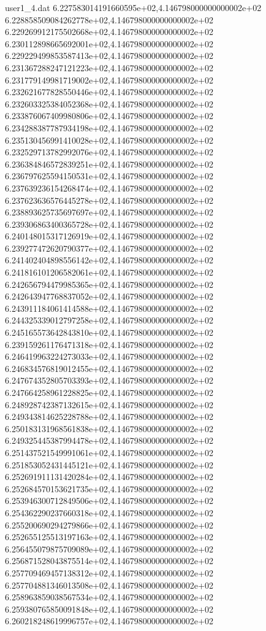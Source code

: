 \begin{filecontents}{user1_4.dat}
6.227583014191660595e+02,4.146798000000000002e+02
6.228858509084262778e+02,4.146798000000000002e+02
6.229269912175502668e+02,4.146798000000000002e+02
6.230112898665692001e+02,4.146798000000000002e+02
6.229229499853587413e+02,4.146798000000000002e+02
6.231367288247121223e+02,4.146798000000000002e+02
6.231779149981719002e+02,4.146798000000000002e+02
6.232621677828550446e+02,4.146798000000000002e+02
6.232603325384052368e+02,4.146798000000000002e+02
6.233876067409980806e+02,4.146798000000000002e+02
6.234288387787934198e+02,4.146798000000000002e+02
6.235130456991410028e+02,4.146798000000000002e+02
6.232529713782992076e+02,4.146798000000000002e+02
6.236384846572839251e+02,4.146798000000000002e+02
6.236797625594150531e+02,4.146798000000000002e+02
6.237639236154268474e+02,4.146798000000000002e+02
6.237623636576445278e+02,4.146798000000000002e+02
6.238893625735697697e+02,4.146798000000000002e+02
6.239306863400365728e+02,4.146798000000000002e+02
6.240148015317126919e+02,4.146798000000000002e+02
6.239277472620790377e+02,4.146798000000000002e+02
6.241402404898556142e+02,4.146798000000000002e+02
6.241816101206582061e+02,4.146798000000000002e+02
6.242656794479985365e+02,4.146798000000000002e+02
6.242643947768837052e+02,4.146798000000000002e+02
6.243911184061414588e+02,4.146798000000000002e+02
6.244325339012797258e+02,4.146798000000000002e+02
6.245165573642843810e+02,4.146798000000000002e+02
6.239159261176471318e+02,4.146798000000000002e+02
6.246419963224273033e+02,4.146798000000000002e+02
6.246834576819012455e+02,4.146798000000000002e+02
6.247674352805703393e+02,4.146798000000000002e+02
6.247664258961228825e+02,4.146798000000000002e+02
6.248928742387132615e+02,4.146798000000000002e+02
6.249343814625228788e+02,4.146798000000000002e+02
6.250183131968561838e+02,4.146798000000000002e+02
6.249325445387994478e+02,4.146798000000000002e+02
6.251437521549991061e+02,4.146798000000000002e+02
6.251853052431445121e+02,4.146798000000000002e+02
6.252691911131420284e+02,4.146798000000000002e+02
6.252684570153621735e+02,4.146798000000000002e+02
6.253946300712849506e+02,4.146798000000000002e+02
6.254362290237660318e+02,4.146798000000000002e+02
6.255200690294279866e+02,4.146798000000000002e+02
6.252655125513197163e+02,4.146798000000000002e+02
6.256455079875709089e+02,4.146798000000000002e+02
6.256871528043875514e+02,4.146798000000000002e+02
6.257709469457138312e+02,4.146798000000000002e+02
6.257704881346013508e+02,4.146798000000000002e+02
6.258963859038567534e+02,4.146798000000000002e+02
6.259380765850091848e+02,4.146798000000000002e+02
6.260218248619996757e+02,4.146798000000000002e+02

\end{filecontents}
